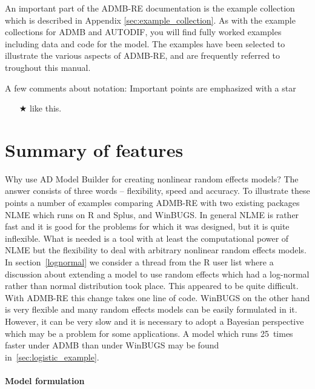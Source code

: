 \documentclass[12pt,letter,reqno]{book}
\begin{document}
An important part of the ADMB-RE documentation is the example collection which is described in Appendix \ref{sec:example_collection}.
As with the example collections for ADMB and AUTODIF, you will find fully worked examples including data and code for the model. 
The examples have been selected to illustrate the various aspects of ADMB-RE, and are frequently referred to troughout this manual.

A few comments about notation: Important points are emphasized with a star
\begin{itemize}
\item[$\bigstar$] like this.
\end{itemize}


\section{Summary of features}
Why use AD Model Builder for creating nonlinear random effects models? The answer consists of three words --
flexibility, speed and accuracy. To illustrate these points a number of examples comparing ADMB-RE with two
existing packages NLME which runs on R and Splus, and WinBUGS. In general NLME is rather fast and it is good for
the problems for which it was designed, but it is quite inflexible. What is needed is a tool with at least the
computational power of NLME but the flexibility to deal with arbitrary nonlinear random effects models. In
section~\ref{lognormal} we consider a thread from the R user list where a discussion about extending a model to
use random effects which had a log-normal rather than normal distribution took place. This appeared to be quite
difficult. With ADMB-RE this change takes one line of code. WinBUGS on the other hand is very flexible and many
random effects models can be easily formulated in it. However, it can be very slow and it is necessary to adopt
a Bayesian perspective which may be a problem for some applications. 
A model which runs 25~times faster under ADMB than under WinBUGS may be found in~\ref{sec:logistic_example}.

\paragraph{Model formulation}
\end{document}
